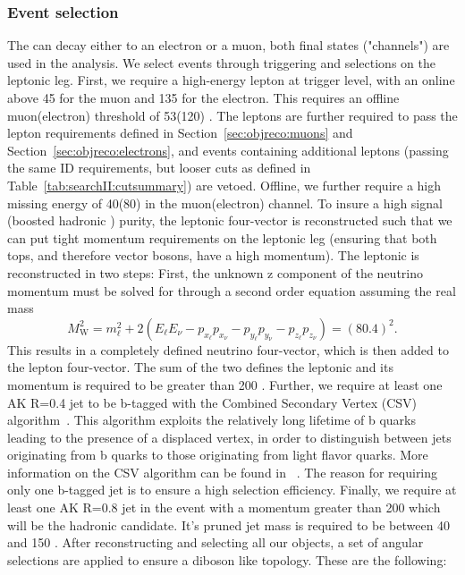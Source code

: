 \subsubsection{Event selection}
\label{sec:searchI:vtag:evsel}
The \PW can decay either to an electron or a muon, both final states ("channels") are used in the analysis. We select events through triggering and selections on the leptonic leg. First, we require a high-energy lepton at trigger level, with an online \PT above 45 \GeV for the muon and 135 \GeV for the electron. This requires an offline muon(electron) \PT threshold of 53(120) \GeV. The leptons are further required to pass the lepton requirements defined in Section~\ref{sec:objreco:muons} and Section~\ref{sec:objreco:electrons}, and events containing additional leptons (passing the same ID requirements, but looser cuts as defined in Table~\ref{tab:searchII:cutsummary}) are vetoed. Offline, we further require a high missing energy of 40(80) \GeV in the muon(electron) channel. To insure a high signal (boosted hadronic \PW) purity, the leptonic \PW four-vector is reconstructed such that we can put tight momentum requirements on the leptonic leg (ensuring that both tops, and therefore vector bosons, have a high momentum). The leptonic \PW is reconstructed in two steps: First, the unknown z component of the neutrino momentum must be solved for through a second order equation assuming the real \PW mass
\begin{equation*}
M_\mathrm{W}^2 = m_\ell^2   + 2(E_\ell E_\nu - p_{x_\ell}p_{x_\nu} - p_{y_\ell}p_{y_\nu} - p_{z_\ell}p_{z_\nu} ) = (80.4)^2.  
\end{equation*}
This results in a completely defined neutrino four-vector, which is then added to the lepton four-vector. The sum of the two defines the leptonic \PW and its momentum is required to be greater than 200 \GeV. \newline
Further, we require at least one AK R=0.4 jet to be b-tagged with the Combined Secondary Vertex (CSV) algorithm~\cite{1748-0221-8-04-P04013,1748-0221-13-05-P05011}. This algorithm exploits the relatively long lifetime of b quarks leading to the presence of a displaced vertex, in order to distinguish between jets originating from b quarks to those originating from light flavor quarks. More information on the CSV algorithm can be found in ~\cite{1748-0221-8-04-P04013,1748-0221-13-05-P05011}. The reason for requiring only one b-tagged jet is to ensure a high selection efficiency.\newline
Finally, we require at least one AK R=0.8 jet in the event with a momentum greater than 200 \GeV which will be the hadronic \PW candidate. It's pruned jet mass is required to be between 40 \GeV and 150 \GeV. After reconstructing and selecting all our objects, a set of angular selections are applied to ensure a diboson like topology. These are the following:
